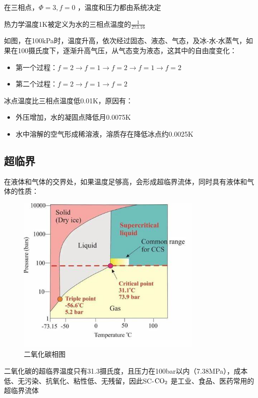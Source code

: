 在三相点，$\Phi = 3, f = 0$ ，温度和压力都由系统决定
\begin{notation}
    热力学温度1K被定义为水的三相点温度的$\frac{1}{273.16}$
\end{notation}
如图，在100kPa时，温度升高，依次经过固态、液态、气态，及冰-水-水蒸气，如果在100摄氏度下，逐渐升高气压，从气态变为液态，这其中的自由度变化：
\begin{itemize}
    \item 第一个过程：$f = 2\to f = 1 \to f = 2\to f = 1\to f = 2$
    \item 第二个过程：$f = 2\to f = 1\to f = 2$
\end{itemize}
\begin{notation}
    冰点温度比三相点温度低0.01K，原因有：
    \begin{itemize}
        \item 外压增加，水的凝固点降低月0.0075K
        \item 水中溶解的空气形成稀溶液，溶质存在降低冰点约0.0025K
    \end{itemize}
\end{notation}
\subsection{超临界}%
\label{sub:超临界}
在液体和气体的交界处，如果温度足够高，会形成超临界流体，同时具有液体和气体的性质：
\begin{figure}[htpb]
    \centering
    \includegraphics[width=0.8\textwidth]{./figures/二氧化碳相图.jpg}
    \caption{二氧化碳相图}
    \label{fig:-figures-二氧化碳相图-jpg}
\end{figure}
\begin{notation}
二氧化碳的超临界温度只有31.3摄氏度，且压力在100bar以内（7.38MPa），成本低、无污染、抗氧化、粘性低、无残留，因此SC-$\ce{CO_2}$ 是工业、食品、医药常用的超临界流体
\end{notation}
